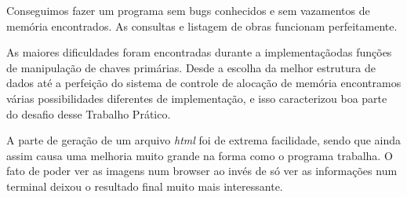 \documentclass{article}
\begin{document}
Conseguimos fazer um programa sem bugs conhecidos e sem vazamentos de memória encontrados. As consultas e listagem de obras funcionam perfeitamente.

As maiores dificuldades foram encontradas durante a implementaçãodas funções de manipulação de chaves primárias. Desde a escolha da melhor estrutura de dados até a perfeição do sistema de controle de alocação de memória encontramos várias possibilidades diferentes de implementação, e isso caracterizou boa parte do desafio desse Trabalho Prático.

A parte de geração de um arquivo \textit{html} foi de extrema facilidade, sendo que ainda assim causa uma melhoria muito grande na forma como o programa trabalha. O fato de poder ver as imagens num browser ao invés de só ver as informações num terminal deixou o resultado final muito mais interessante.
\end{document}
